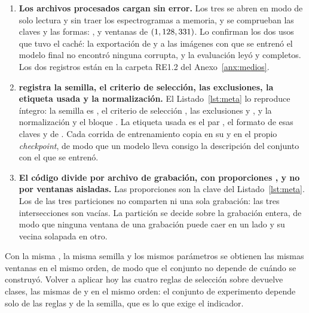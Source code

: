 \begin{enumerate}
    \item \textbf{Los archivos procesados cargan sin error.} Los tres 
          se abren en modo de solo lectura y sin traer los espectrogramas a
          memoria, y se comprueban
          las claves y las formas: \nWindowsTrain{}, \nWindowsVal{} y
          \nWindowsTest{} ventanas de $(1, 128{}, 331{})$. Lo confirman
          los dos usos que tuvo el caché: la exportación de  y
           a las imágenes con que se entrenó el modelo final no
          encontró ninguna corrupta, y la evaluación leyó  y
           completos. Los dos registros están en la carpeta RE1.2
          del Anexo~\ref{anx:medios}.
    \item \textbf{ registra la semilla, el criterio de selección,
              las exclusiones, la etiqueta usada y la normalización.} El
          Listado~\ref{lst:meta} lo reproduce íntegro: la semilla es , el
          criterio de selección , las exclusiones
           y , y la normalización
           y el bloque . La etiqueta usada es el par
          , el formato de esas claves y de .
          Cada corrida de entrenamiento copia  en su
           y en el propio \textit{checkpoint}, de modo que un
          modelo lleva consigo la descripción del conjunto con el que se entrenó.
    \item \textbf{El código divide por archivo de grabación, con proporciones
              \splitRatios{}, y no por ventanas aisladas.} Las proporciones son la
          clave  del Listado~\ref{lst:meta}. Los
           de las tres particiones no comparten ni una sola
          grabación: las tres intersecciones son vacías. La partición
          se decide sobre la grabación entera, de modo que ninguna ventana de una
          grabación puede caer en un lado y su vecina solapada en otro.
\end{enumerate}



 Con la misma , la misma
semilla y los mismos parámetros se obtienen las mismas ventanas en el mismo
orden, de modo que el conjunto no depende de cuándo se construyó. Volver a aplicar hoy
las cuatro reglas de selección sobre  devuelve
\nClassesToday{} clases, las mismas \nClasses{} de  y en el
mismo orden: el conjunto de experimento depende solo de las reglas y de la
semilla, que es lo que exige el indicador.

